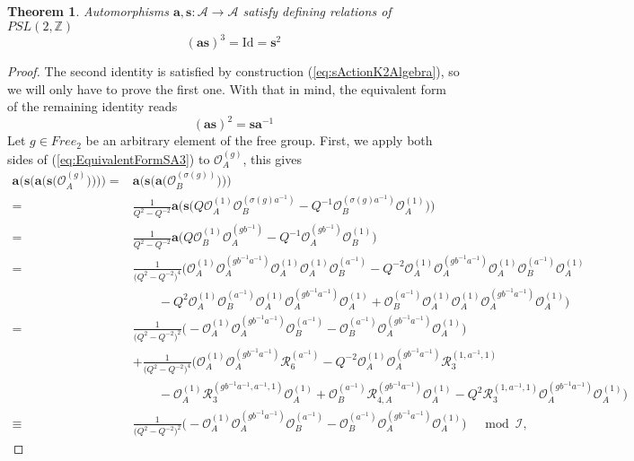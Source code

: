 \documentclass{amsart}
\newtheorem{theorem}{Theorem}
\newcommand{\Oa}{\mathcal O_A}
\newcommand{\Ob}{\mathcal O_B}
\newcommand{\R}{\mathcal R}
\begin{document}
\begin{theorem}
Automorphisms $\mathbf a,\mathbf s:\mathcal A\rightarrow\mathcal A$ satisfy defining relations of $PSL(2,\mathbb Z)$
\begin{equation*}
(\mathbf a\mathbf s)^3=\mathrm{Id}=\mathbf s^2
\end{equation*}
\label{th:AlgebraPSL2ZActionSA}
\end{theorem}
\begin{proof}
The second identity is satisfied by construction (\ref{eq:sActionK2Algebra}), so we will only have to prove the first one. With that in mind, the equivalent form of the remaining identity reads
\begin{equation}
(\mathbf a\mathbf s)^2=\mathbf s\mathbf a^{-1}
\label{eq:EquivalentFormSA3}
\end{equation}
Let $g\in Free_2$ be an arbitrary element of the free group. First, we apply both sides of (\ref{eq:EquivalentFormSA3}) to $\Oa^{(g)}$, this gives
\begin{equation}
\begin{aligned}
\mathbf a\big(\mathbf s\big(\mathbf a\big(\mathbf s\big(\Oa^{(g)}\big)\big)\big)\big)=&\mathbf a\big(\mathbf s\big(\mathbf a\big(\Ob^{(\sigma(g))}\big)\big)\big)\\
=&\frac1{Q^2-Q^{-2}}\mathbf a\Big(\mathbf s\Big(Q\Oa^{(1)}\Ob^{(\sigma(g)a^{-1})}-Q^{-1}\Ob^{(\sigma(g)a^{-1})}\Oa^{(1)}\Big)\Big)\\
=&\frac1{Q^2-Q^{-2}}\mathbf a\Big(Q\Ob^{(1)}\Oa^{(gb^{-1})}-Q^{-1}\Oa^{(gb^{-1})}\Ob^{(1)}\Big)\\
=&\frac1{\big(Q^2-Q^{-2}\big)^4}\Big(\Oa^{(1)}\Oa^{(gb^{-1}a^{-1})}\Oa^{(1)}\Oa^{(1)}\Ob^{(a^{-1})}-Q^{-2}\Oa^{(1)}\Oa^{(gb^{-1}a^{-1})}\Oa^{(1)}\Ob^{(a^{-1})}\Oa^{(1)}\\
&\qquad-Q^2\Oa^{(1)}\Ob^{(a^{-1})}\Oa^{(1)}\Oa^{(gb^{-1}a^{-1})}\Oa^{(1)}+\Ob^{(a^{-1})}\Oa^{(1)}\Oa^{(1)}\Oa^{(gb^{-1}a^{-1})}\Oa^{(1)}\Big)\\
=&\frac1{\big(Q^2-Q^{-2}\big)^2}\Big(-\Oa^{(1)}\Oa^{(gb^{-1}a^{-1})}\Ob^{(a^{-1})}-\Ob^{(a^{-1})}\Oa^{(gb^{-1}a^{-1})}\Oa^{(1)}\Big)\\
&+\frac1{\big(Q^2-Q^{-2}\big)^4}\Big(\Oa^{(1)}\Oa^{(gb^{-1}a^{-1})}\R_{6}^{(a^{-1})}-Q^{-2}\Oa^{(1)}\Oa^{(gb^{-1}a^{-1})}\R_{3}^{(1,a^{-1},1)}\\
&\qquad-\Oa^{(1)}\R_{3}^{(gb^{-1}a^{-1},a^{-1},1)}\Oa^{(1)}+\Ob^{(a^{-1})}\R_{4,A}^{(gb^{-1}a^{-1})}\Oa^{(1)}-Q^2\R_{3}^{(1,a^{-1},1)}\Oa^{(gb^{-1}a^{-1})}\Oa^{(1)}\Big)\\
\equiv&\frac1{\big(Q^2-Q^{-2}\big)^2}\Big(-\Oa^{(1)}\Oa^{(gb^{-1}a^{-1})}\Ob^{(a^{-1})}-\Ob^{(a^{-1})}\Oa^{(gb^{-1}a^{-1})}\Oa^{(1)}\Big)\quad\bmod\mathcal I,

\end{aligned}
\end{equation}
\end{proof}
\end{document}
